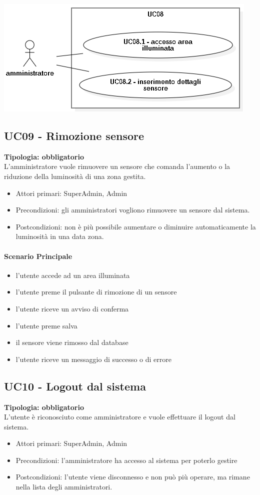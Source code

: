 \documentclass[12pt]{article}
\begin{document}
\includegraphics[scale=0.5]{UC08.png}

\subsection{UC09 - Rimozione sensore}
\textbf{Tipologia: obbligatorio}\\
L'amministratore vuole rimuovere un sensore che comanda l'aumento o la riduzione della luminosità di una zona gestita.
\begin{itemize}
	\item Attori primari: SuperAdmin, Admin
	\item Precondizioni: gli amministratori vogliono rimuovere un sensore dal sistema.
	\item Postcondizioni: non è più possibile aumentare o diminuire automaticamente la luminosità in una data zona.
\end{itemize}
\paragraph{Scenario Principale}
\begin{itemize}
	\item l'utente accede ad un area illuminata
	\item l'utente preme il pulsante di rimozione di un sensore
	\item l'utente riceve un avviso di conferma
	\item l'utente preme salva
	\item il sensore viene rimosso dal database
	\item l'utente riceve un messaggio di successo o di errore
\end{itemize}


\subsection{UC10 - Logout dal sistema}
\textbf{Tipologia: obbligatorio} \\
L'utente è riconosciuto come amministratore e vuole effettuare il logout dal sistema.
\begin{itemize}
	\item Attori primari: SuperAdmin, Admin
	\item Precondizioni: l'amministratore ha accesso al sistema per poterlo gestire
	\item Postcondizioni: l'utente viene disconnesso e non può più operare, ma rimane nella lista degli amministratori.
\end{itemize}
\end{document}
